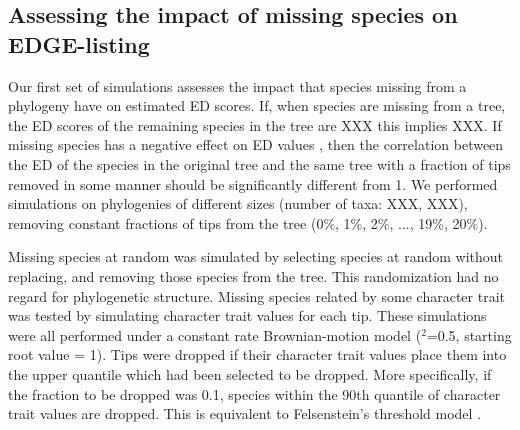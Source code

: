 \documentclass[12pt,english]{article}
\begin{document}
\subsection*{Assessing the impact of missing species on EDGE-listing}
Our first set of simulations assesses the impact that species missing from a
phylogeny have on estimated ED scores. If, when species are missing from a
tree, the ED scores of the remaining species in the tree are XXX this implies
XXX.
If missing species has a negative effect on ED values
, then the correlation between the ED of the species in the original tree and
the same tree with a fraction of tips removed in some manner should be
significantly different from 1. We performed simulations on phylogenies of
different sizes (number of taxa: XXX, XXX), removing constant fractions of tips
from the tree (0\%, 1\%, 2\%, ..., 19\%, 20\%).

Missing species at random was simulated by selecting species at random
without replacing, and removing those species from the tree. This
randomization had no regard for phylogenetic structure. Missing
species related by some character trait was tested by simulating
character trait values for each tip. These simulations were all
performed under a constant rate Brownian-motion model
(\sigma$^2$=0.5, starting root value = 1).
Tips were dropped if their character trait values place them into the
upper quantile which had been selected to be dropped. More
specifically, if the fraction to be dropped was 0.1, species within
the 90th quantile of character trait values are dropped. This is
equivalent to Felsenstein's threshold model \autocite{Felsenstein2004}
.
\end{document}
